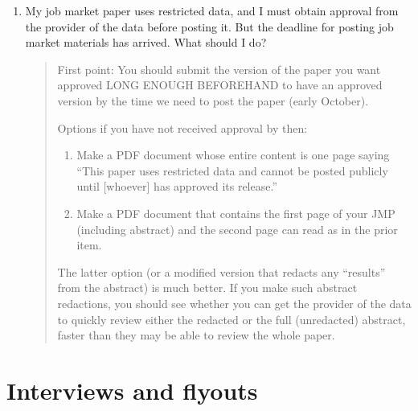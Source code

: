 \documentclass{\classes/econtex}
\begin{document}
\begin{enumerate}
\begin{quote}
  \end{quote}
\item  My job market paper uses restricted data, and I must obtain approval from the provider of the data before posting it. But the deadline for posting job market materials has arrived. What should I do?

  \begin{quote}
    First point: You should submit the version of the paper you want approved LONG ENOUGH BEFOREHAND to have an approved version by the time we need to post the paper (early October).

    Options if you have not received approval by then:
    \begin{enumerate}
    \item Make a PDF document whose entire content is one page saying ``This paper uses restricted data and cannot be posted publicly until [whoever] has approved its release.''
    \item Make a PDF document that contains the first page of your JMP (including abstract) and the second page can read as in the prior item.
    \end{enumerate}

    The latter option (or a modified version that redacts any ``results'' from the abstract) is much better. If you make such abstract redactions, you should see whether you can get the provider of the data to quickly review either the redacted or the full (unredacted) abstract, faster than they may be able to review the whole paper.

  \end{quote}
\end{enumerate}

\section*{Interviews and flyouts}
\end{document}
